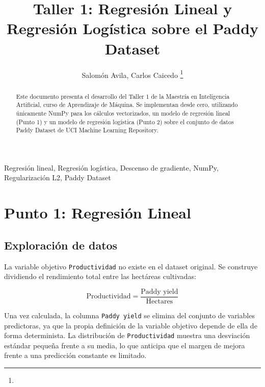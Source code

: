\documentclass[journal]{IEEEtran}
\begin{document}
\title{Taller 1: Regresión Lineal y Regresión Logística sobre el Paddy Dataset}
\author{Salomón Avila, Carlos Caicedo
\thanks{}}
\maketitle

\begin{abstract}
Este documento presenta el desarrollo del Taller 1 de la Maestría en Inteligencia Artificial, curso de Aprendizaje de Máquina. Se implementan desde cero, utilizando únicamente NumPy para los cálculos vectorizados, un modelo de regresión lineal (Punto 1) y un modelo de regresión logística (Punto 2) sobre el conjunto de datos Paddy Dataset de UCI Machine Learning Repository.
\end{abstract}

\begin{IEEEkeywords}
Regresión lineal, Regresión logística, Descenso de gradiente, NumPy, Regularización L2, Paddy Dataset
\end{IEEEkeywords}

\section{Punto 1: Regresión Lineal}

\subsection{Exploración de datos}

La variable objetivo \texttt{Productividad} no existe en el dataset original. Se construye dividiendo el rendimiento total entre las hectáreas cultivadas:

\begin{equation}
\text{Productividad} = \frac{\text{Paddy yield}}{\text{Hectares}}
\label{eq:productividad}
\end{equation}

Una vez calculada, la columna \texttt{Paddy yield} se elimina del conjunto de variables predictoras, ya que la propia definición de la variable objetivo depende de ella de forma determinista. La distribución de \texttt{Productividad} muestra una desviación estándar pequeña frente a su media, lo que anticipa que el margen de mejora frente a una predicción constante es limitado.
\end{document}
